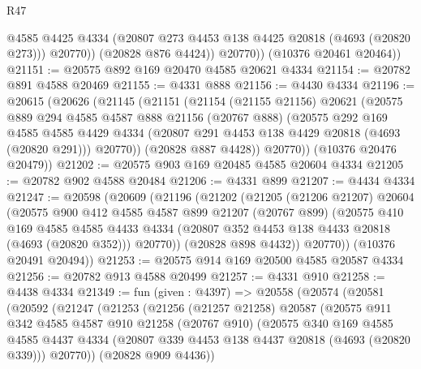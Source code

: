 \begin{lexlean}{R47}
\begin{coremodule}
                @4585
                @4425
                @4334
                (@20807 @273 @4453 @138 @4425 @20818 (@4693 (@20820 @273)))
                @20770))
            (@20828 @876 @4424))
          @20770))
      (@10376 @20461 @20464))
@21151 := @20575 @892 @169 @20470 @4585 @20621 @4334
@21154 := @20782 @891 @4588 @20469
@21155 := @4331 @888
@21156 := @4430 @4334
@21196 := @20615
    (@20626
      (@21145
        (@21151
          (@21154
            (@21155 @21156)
            @20621
            (@20575
              @889
              @294
              @4585
              @4587
              @888
              @21156
              (@20767 @888)
              (@20575
                @292
                @169
                @4585
                @4585
                @4429
                @4334
                (@20807 @291 @4453 @138 @4429 @20818 (@4693 (@20820 @291)))
                @20770))
            (@20828 @887 @4428))
          @20770))
      (@10376 @20476 @20479))
@21202 := @20575 @903 @169 @20485 @4585 @20604 @4334
@21205 := @20782 @902 @4588 @20484
@21206 := @4331 @899
@21207 := @4434 @4334
@21247 := @20598
    (@20609
      (@21196
        (@21202
          (@21205
            (@21206 @21207)
            @20604
            (@20575
              @900
              @412
              @4585
              @4587
              @899
              @21207
              (@20767 @899)
              (@20575
                @410
                @169
                @4585
                @4585
                @4433
                @4334
                (@20807 @352 @4453 @138 @4433 @20818 (@4693 (@20820 @352)))
                @20770))
            (@20828 @898 @4432))
          @20770))
      (@10376 @20491 @20494))
@21253 := @20575 @914 @169 @20500 @4585 @20587 @4334
@21256 := @20782 @913 @4588 @20499
@21257 := @4331 @910
@21258 := @4438 @4334
@21349 := fun (given : @4397) =>
  @20558
    (@20574
      (@20581
        (@20592
          (@21247
            (@21253
              (@21256
                (@21257 @21258)
                @20587
                (@20575
                  @911
                  @342
                  @4585
                  @4587
                  @910
                  @21258
                  (@20767 @910)
                  (@20575
                    @340
                    @169
                    @4585
                    @4585
                    @4437
                    @4334
                    (@20807 @339 @4453 @138 @4437 @20818 (@4693 (@20820 @339)))
                    @20770))
                (@20828 @909 @4436))

\end{coremodule}
\end{lexlean}
